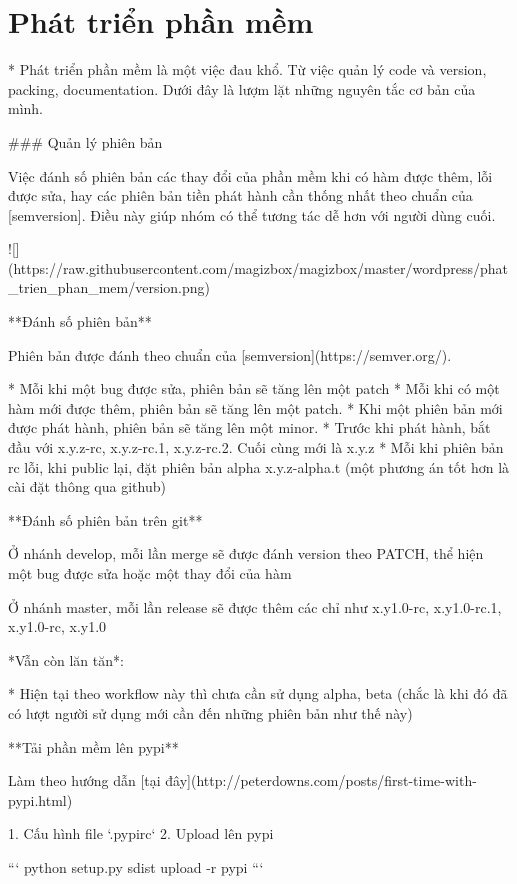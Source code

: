 \chapter{Phát triển phần mềm}

* Phát triển phần mềm là một việc đau khổ. Từ việc quản lý code và version, packing, documentation. Dưới đây là lượm lặt những nguyên tắc cơ bản của mình.

### Quản lý phiên bản

Việc đánh số phiên bản các thay đổi của phần mềm khi có hàm được thêm, lỗi được sửa, hay các phiên bản tiền phát hành cần thống nhất theo chuẩn của [semversion]. Điều này giúp nhóm có thể tương tác dễ hơn với người dùng cuối.

![](https://raw.githubusercontent.com/magizbox/magizbox/master/wordpress/phat_trien_phan_mem/version.png)

**Đánh số phiên bản**

Phiên bản được đánh theo chuẩn của [semversion](https://semver.org/).

* Mỗi khi một bug được sửa, phiên bản sẽ tăng lên một patch
* Mỗi khi có một hàm mới được thêm, phiên bản sẽ tăng lên một patch.
* Khi một phiên bản mới được phát hành, phiên bản sẽ tăng lên một minor.
* Trước khi phát hành, bắt đầu với x.y.z-rc, x.y.z-rc.1, x.y.z-rc.2. Cuối cùng mới là x.y.z
* Mỗi khi phiên bản rc lỗi, khi public lại, đặt phiên bản alpha x.y.z-alpha.t (một phương án tốt hơn là cài đặt thông qua github)

**Đánh số phiên bản trên git**

Ở nhánh develop, mỗi lần merge sẽ được đánh version theo PATCH, thể hiện một bug được sửa hoặc một thay đổi của hàm

Ở nhánh master, mỗi lần release sẽ được thêm các chỉ như x.y1.0-rc, x.y1.0-rc.1, x.y1.0-rc, x.y1.0

*Vẫn còn lăn tăn*:

* Hiện tại theo workflow này thì chưa cần sử dụng alpha, beta (chắc là khi đó đã có lượt người sử dụng mới cần đến những phiên bản như thế này)

**Tải phần mềm lên pypi**

Làm theo hướng dẫn [tại đây](http://peterdowns.com/posts/first-time-with-pypi.html)

1. Cấu hình file `.pypirc`
2. Upload lên pypi

```
python setup.py sdist upload -r pypi
```